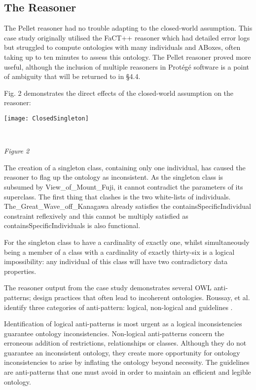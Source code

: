 \documentclass[titlepage,a4paper,12pt,oneside]{book}
\begin{document}
\subsection{The Reasoner}
The Pellet reasoner had no trouble adapting to the closed-world assumption.
This case study originally utilised the FaCT++ reasoner which had detailed error logs but struggled to compute ontologies with many individuals and ABoxes, often taking up to ten minutes to assess this ontology.
The Pellet reasoner proved more useful, although the inclusion of multiple reasoners in Protégé software is a point of ambiguity that will be returned to in §4.4.\par
Fig. 2 demonstrates the direct effects of the closed-world assumption on the reasoner: 
\newline
\newline
\centerline{\texttt{[image: ClosedSingleton]}}\\
\centerline{\textit{Figure 2}}
\newline
The creation of a singleton class, containing only one individual, has caused the reasoner to flag up the ontology as inconsistent.
As the singleton class is subsumed by View\_of\_Mount\_Fuji, it cannot contradict the parameters of its superclass.
The first thing that clashes is the two white-lists of individuals.
The\_Great\_Wave\_off\_Kanagawa already satisfies the containsSpecificIndividual constraint reflexively and this cannot be multiply satisfied as containsSpecificIndividuals is also functional.\par
For the singleton class to have a cardinality of exactly one, whilst simultaneously being a member of a class with a cardinality of exactly thirty-six is a logical impossibility: any individual of this class will have two contradictory data properties.\par
The reasoner output from the case study demonstrates several OWL anti-patterns; design practices that often lead to incoherent ontologies.
Roussay, et al. identify three categories of anti-pattern: logical, non-logical and guidelines \cite[1]{antipatterns2009}.\par
Identification of logical anti-patterns is most urgent as a logical inconsistencies guarantee ontology inconsistencies.
Non-logical anti-patterns concern the erroneous addition of restrictions, relationships or classes.
Although they do not guarantee an inconsistent ontology, they create more opportunity for ontology inconsistencies to arise by inflating the ontology beyond necessity.
The guidelines are anti-patterns that one must avoid in order to maintain an efficient and legible ontology.\par
\end{document}

